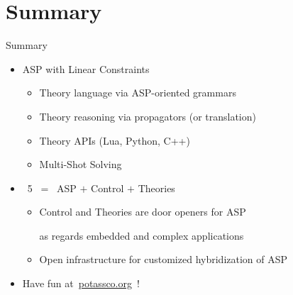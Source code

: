 \documentclass[t,fleqn]{beamer}
\begin{document}
\section{Summary}
\begin{frame}{Summary}
  \begin{itemize}
  \item  ASP with Linear Constraints
    \smallskip
    \begin{itemize}
    \item Theory language via ASP-oriented grammars
    \item Theory reasoning via propagators (or translation)
    \item Theory APIs (Lua, Python, C++)
    \item Multi-Shot Solving
    \end{itemize}
    \medskip
  \item <2-> \clingo~5 \ = \ ASP $+$ \alert<3-4>{Control} $+$ \alert<3-4>{Theories}
    \smallskip
    \begin{itemize}\normalsize
    \item <2-> \alert<4>{Control} and \alert<4>{Theories} are \alert<4>{door openers} for ASP\par as regards embedded and complex applications
      \smallskip
    \item <2-> Open infrastructure for customized hybridization of ASP
    \end{itemize}
    \bigskip
  \item <3-> Have fun at\ \alert{\url{potassco.org}}~!
  \end{itemize}
\end{frame}
\end{document}
